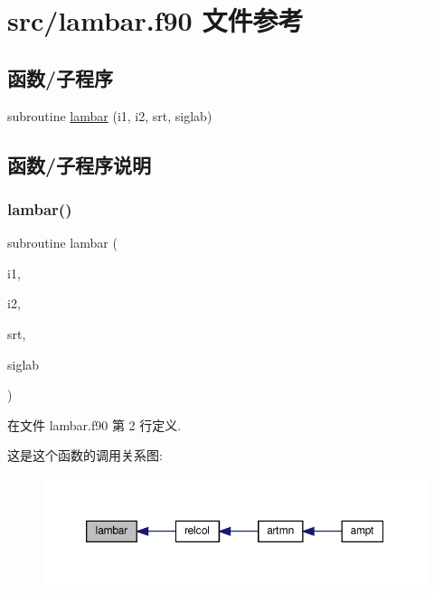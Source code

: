 \hypertarget{lambar_8f90}{}\section{src/lambar.f90 文件参考}
\label{lambar_8f90}
\subsection*{函数/子程序}
\begin{DoxyCompactItemize}
\item 
subroutine \mbox{\hyperlink{lambar_8f90_a5f08d04290b911e84ea2d58d5d58ee2f}{lambar}} (i1, i2, srt, siglab)
\end{DoxyCompactItemize}


\subsection{函数/子程序说明}
\mbox{\label{lambar_8f90_a5f08d04290b911e84ea2d58d5d58ee2f}} 
\subsubsection{\texorpdfstring{lambar()}{lambar()}}
{\footnotesize\ttfamily subroutine lambar (\begin{DoxyParamCaption}\item[{}]{i1,  }\item[{}]{i2,  }\item[{}]{srt,  }\item[{}]{siglab }\end{DoxyParamCaption})}



在文件 lambar.\+f90 第 2 行定义.

这是这个函数的调用关系图\+:
\nopagebreak
\begin{figure}[H]
\begin{center}
\leavevmode
\includegraphics[width=350pt]{lambar_8f90_a5f08d04290b911e84ea2d58d5d58ee2f_icgraph}
\end{center}
\end{figure}
